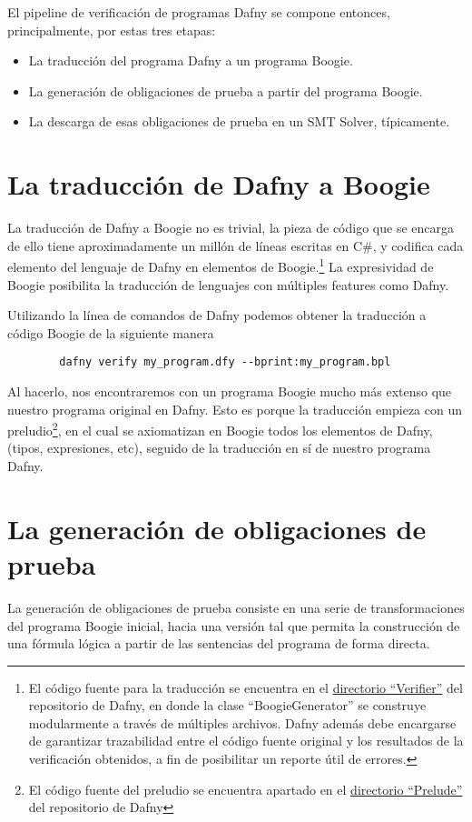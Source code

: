 \documentclass[12pt, a4paper, openany, fleqn]{book}
\begin{document}
    El pipeline de verificación de programas Dafny se compone entonces, principalmente, por estas tres etapas:
    \begin{itemize}
        \item La traducción del programa Dafny a un programa Boogie.
        \item La generación de obligaciones de prueba a partir del programa Boogie.
        \item La descarga de esas obligaciones de prueba en un SMT Solver, típicamente.
    \end{itemize}

    \section{La traducción de Dafny a Boogie}
    La traducción de Dafny a Boogie no es trivial, la pieza de código que se encarga de ello tiene aproximadamente un millón de líneas escritas en C\#, y codifica cada elemento del lenguaje de Dafny en elementos de Boogie.\footnote{El código fuente para la traducción se encuentra en el \href{https://github.com/dafny-lang/dafny/tree/v4.7.0/Source/DafnyCore/Verifier}{directorio ``Verifier''} del repositorio de Dafny, en donde la clase ``BoogieGenerator'' se construye modularmente a través de múltiples archivos. Dafny además debe encargarse de garantizar trazabilidad entre el código fuente original y los resultados de la verificación obtenidos, a fin de posibilitar un reporte útil de errores.} La expresividad de Boogie posibilita la traducción de lenguajes con múltiples features como Dafny.

    Utilizando la línea de comandos de Dafny podemos obtener la traducción a código Boogie de la siguiente manera
    \begin{verbatim}
        dafny verify my_program.dfy --bprint:my_program.bpl
    \end{verbatim}
    Al hacerlo, nos encontraremos con un programa Boogie mucho más extenso que nuestro programa original en Dafny. Esto es porque la traducción empieza con un preludio\footnote{El código fuente del preludio se encuentra apartado en el \href{https://github.com/dafny-lang/dafny/blob/v4.7.0/Source/DafnyCore/DafnyPrelude.bpl}{directorio ``Prelude''} del repositorio de Dafny}, en el cual se axiomatizan en Boogie todos los elementos de Dafny, (tipos, expresiones, etc), seguido de la traducción en sí de nuestro programa Dafny.

    \section{La generación de obligaciones de prueba}
    La generación de obligaciones de prueba consiste en una serie de transformaciones del programa Boogie inicial, hacia una versión tal que permita la construcción de una fórmula lógica a partir de las sentencias del programa de forma directa.
\end{document}

